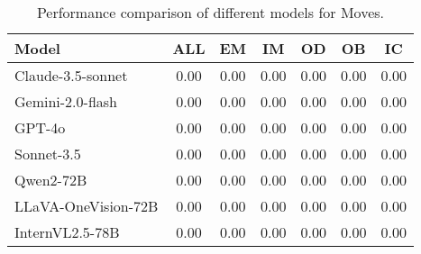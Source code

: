 \begin{table*}[h]
    \caption{Performance comparison of different models for Moves.}
    \label{tab:VLM_move_statistics}
    \centering
    \begin{tabular}{lcccccc}
        \toprule
        \textbf{Model} & \textbf{ALL} & \textbf{EM} & \textbf{IM} & \textbf{OD} & \textbf{OB} & \textbf{IC} \\
        \midrule
        Claude-3.5-sonnet     & 0.00 & 0.00 & 0.00 & 0.00 & 0.00 & 0.00 \\
        Gemini-2.0-flash      & 0.00 & 0.00 & 0.00 & 0.00 & 0.00 & 0.00 \\
        GPT-4o                & 0.00 & 0.00 & 0.00 & 0.00 & 0.00 & 0.00 \\
        Sonnet-3.5            & 0.00 & 0.00 & 0.00 & 0.00 & 0.00 & 0.00 \\
        Qwen2-72B             & 0.00 & 0.00 & 0.00 & 0.00 & 0.00 & 0.00 \\
        LLaVA-OneVision-72B   & 0.00 & 0.00 & 0.00 & 0.00 & 0.00 & 0.00 \\
        InternVL2.5-78B       & 0.00 & 0.00 & 0.00 & 0.00 & 0.00 & 0.00 \\
        \bottomrule
    \end{tabular}
\end{table*}
